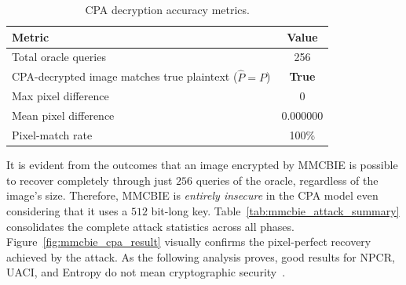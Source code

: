\begin{table}[t]
\centering
\caption{CPA decryption accuracy metrics.}
\label{tab:phase3_results}
\begin{tabular}{lc}
\toprule
Metric & Value \\
\midrule
Total oracle queries                                         & 256 \\
CPA-decrypted image matches true plaintext ($\hat{P} = P$)  & \textbf{True} \\
Max pixel difference                                         & 0 \\
Mean pixel difference                                        & 0.000000 \\
Pixel-match rate                                             & 100\% \\
\bottomrule
\end{tabular}
\end{table}


\begin{table}[t]
\centering
\tiny
\setlength{\tabcolsep}{2pt}
\renewcommand{\arraystretch}{0.8}
\caption{Summary of the chosen-plaintext attack on the MMCBIE scheme. Total oracle queries: $256$.}
\label{tab:mmcbie_attack_summary}
\end{table}
\noindent It is evident from the outcomes that an image encrypted by MMCBIE is possible to recover completely through just $256$ queries of the oracle, regardless of the image's size. Therefore, MMCBIE is \emph{entirely insecure} in the CPA model even considering that it uses a $512$ bit-long key. Table~\ref{tab:mmcbie_attack_summary} consolidates the complete attack statistics across all phases. Figure~\ref{fig:mmcbie_cpa_result} visually confirms the pixel-perfect recovery achieved by the attack. As the following analysis proves, good results for NPCR, UACI, and Entropy do not mean cryptographic security~\cite{wen2023cryptanalysis}.

